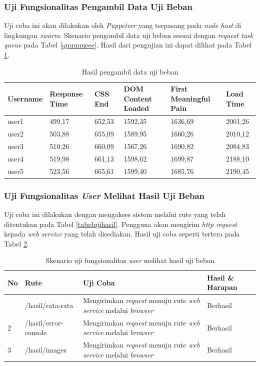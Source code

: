 			\subsubsection{Uji Fungsionalitas Pengambil Data Uji Beban}
				Uji coba ini akan dilakukan oleh \textit{Puppeteer} yang terpasang pada \textit{node host} di lingkungan \textit{swarm}. Skenario pengambil data uji beban sesuai dengan \textit{request task queue} pada Tabel \ref{quuuuueee}. Hasil dari pengujian ini dapat dilihat pada Tabel \ref{dataujibeban}.
				\begin{longtable}{|p{0.15\textwidth}|p{}|p{}|p{}|p{}|p{}|}
					\caption{Hasil pengambil data uji beban} \label{dataujibeban} \\
					\hline
					\textbf{Username} & \textbf{Response Time} & \textbf{CSS End} & \textbf{DOM Content Loaded} & \textbf{First Meaningful Pain} & \textbf{Load Time} \\ \hline
					\endhead
					\endfoot
					\endlastfoot
					user1 & 499,17 & 652,53 & 1592,35 & 1636,69 & 2001,26 \\ \hline
					user2 & 503,88 & 655,09 & 1589,95 & 1660,26 & 2010,12 \\ \hline
					user3 & 510,26 & 660,09 & 1567,26 & 1690,82 & 2084,83 \\ \hline
					user4 & 519,98 & 661,13 & 1598,62 & 1699,87 & 2188,10 \\ \hline
					user5 & 523,56 & 665,61 & 1599,40 & 1685,76 & 2190,45 \\ \hline
				\end{longtable}
				
			\subsubsection{Uji Fungsionalitas \textit{User} Melihat Hasil Uji Beban}
				Uji coba ini dilakukan dengan mengakses sistem melalui rute yang telah ditentukan pada Tabel \ref{tabelujihasil}. Pengguna akan mengirim \textit{http request} kepada \textit{web service} yang telah
				disediakan. Hasil uji coba seperti tertera pada Tabel \ref{tabelhasilujihasil}.
				\begin{longtable}{|p{}|p{}|p{0.30\textwidth}|p{}|}
					\caption{Skenario uji fungsionalitas \textit{user} melihat hasil uji beban} \label{tabelhasilujihasil} \\ \hline
					\textbf{No} & \textbf{Rute} & \textbf{Uji Coba} & \textbf{Hasil \& Harapan} \\ \hline
					\endhead
					\endfoot
					\endlastfoot
					1 & /hasil/rata-rata & Mengirimkan \textit{request} menuju rute \textit{web service} melalui \textit{browser} & Berhasil \\ \hline
					2 & /hasil/error-console & Mengirimkan \textit{request} menuju rute \textit{web service} melalui \textit{browser} & Berhasil \\ \hline
					3 & /hasil/images & Mengirimkan \textit{request} menuju rute \textit{web service} melalui \textit{browser} & Berhasil \\ \hline
				\end{longtable}
				

